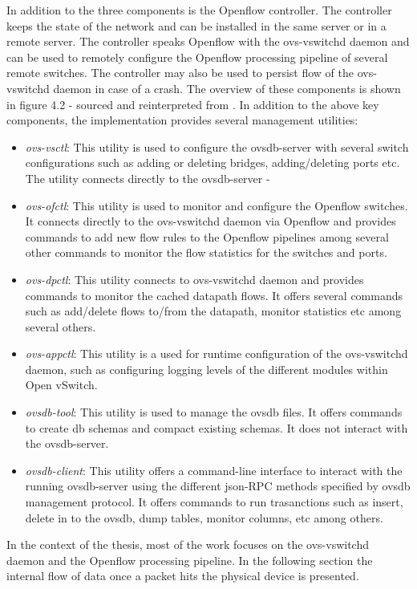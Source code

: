 In addition to the three components is the Openflow controller. The controller keeps the state of the network and can be installed in the same server or in a remote server. The controller speaks Openflow with the ovs-vswitchd daemon and can be used to remotely configure the Openflow processing pipeline of several remote switches. The controller may also be used to persist flow of the ovs-vswitchd daemon in case of a crash. The overview of these components is shown in figure 4.2 - sourced and reinterpreted from \cite{pfaff2015design}.
In addition to the above key components, the implementation provides several management utilities:
\begin{itemize}
	\item \textit{ovs-vsctl}: This utility is used to configure the ovsdb-server with several switch configurations such as adding or deleting bridges, adding/deleting ports etc. The utility connects directly to the ovsdb-server -
	\item \textit{ovs-ofctl}: This utility is used to monitor and configure the Openflow switches. It connects directly to the ovs-vswitchd daemon via Openflow and provides commands to add new flow rules to the Openflow pipelines among several other commands to monitor the flow statistics for the switches and ports.
	\item \textit{ovs-dpctl}: This utility connects to ovs-vswitchd daemon and provides commands to monitor the cached datapath flows. It offers several commands such as add/delete flows to/from the datapath, monitor statistics etc among several others.
	\item \textit{ovs-appctl}: This utility is a used for runtime configuration of the ovs-vswitchd daemon, such as configuring logging levels of the different modules within Open vSwitch.
	\item \textit{ovsdb-tool}: This utility is used to manage the ovsdb files. It offers commands to create db schemas and compact existing schemas. It does not interact with the ovsdb-server.
	\item \textit{ovsdb-client}: This utility offers a command-line interface to interact with the running ovsdb-server using the different json-RPC methods specified by ovsdb management protocol. It offers commands to run trasanctions such as insert, delete in to the ovsdb, dump tables, monitor columns, etc among others.
\end{itemize}

In the context of the thesis, most of the work focuses on the ovs-vswitchd daemon and the Openflow processing pipeline. In the following section the internal flow of data once a packet hits the physical device is presented.

